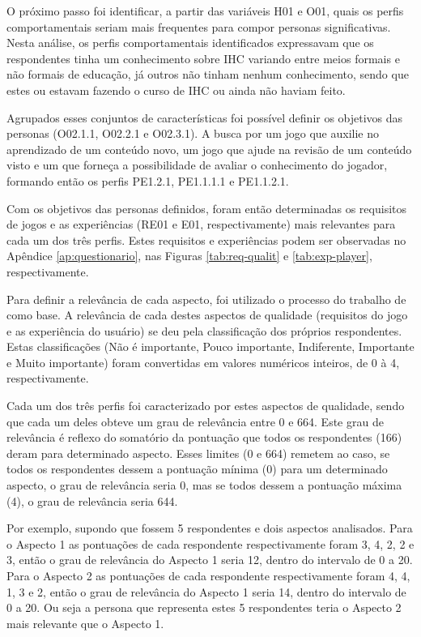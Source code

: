 O próximo passo foi identificar, a partir das variáveis H01 e O01, quais os perfis comportamentais seriam mais frequentes para compor personas significativas. Nesta análise, os perfis comportamentais identificados expressavam que os respondentes tinha um conhecimento sobre IHC variando entre meios formais e não formais de educação, já outros não tinham nenhum conhecimento, sendo que estes ou estavam fazendo o curso de IHC ou ainda não haviam feito.

Agrupados esses conjuntos de características foi possível definir os objetivos das personas (O02.1.1, O02.2.1 e O02.3.1). A busca por um jogo que auxilie no aprendizado de um conteúdo novo, um jogo que ajude na revisão de um conteúdo visto e um que forneça a possibilidade de avaliar o conhecimento do jogador, formando então os perfis PE1.2.1, PE1.1.1.1 e PE1.1.2.1. 

Com os objetivos das personas definidos, foram então determinadas os requisitos de jogos e as experiências (RE01 e E01, respectivamente) mais relevantes para cada um dos três perfis. Estes requisitos e experiências podem ser observadas no Apêndice \ref{ap:questionario}, nas Figuras \ref{tab:req-qualit} e \ref{tab:exp-player}, respectivamente.

Para definir a relevância de cada aspecto, foi utilizado o processo do trabalho de  como base. A relevância de cada destes aspectos de qualidade (requisitos do jogo e as experiência do usuário) se deu pela classificação dos próprios respondentes. Estas classificações (Não é importante, Pouco importante, Indiferente, Importante e Muito importante) foram convertidas em valores numéricos inteiros, de 0 à 4, respectivamente.

Cada um dos três perfis foi caracterizado por estes aspectos de qualidade, sendo que cada um deles obteve um grau de relevância entre 0 e 664. Este grau de relevância é reflexo do somatório da pontuação que todos os respondentes (166) deram para determinado aspecto. Esses limites (0 e 664) remetem ao caso, se todos os respondentes dessem a pontuação mínima (0) para um determinado aspecto, o grau de relevância seria 0, mas se todos dessem a pontuação máxima (4), o grau de relevância seria 644.

Por exemplo, supondo que fossem 5 respondentes e dois aspectos analisados. Para o Aspecto 1 as pontuações de cada respondente respectivamente foram 3, 4, 2, 2 e 3, então o grau de relevância do Aspecto 1 seria 12, dentro do intervalo de 0 a 20. Para o Aspecto 2 as pontuações de cada respondente respectivamente foram 4, 4, 1, 3 e 2, então o grau de relevância do Aspecto 1 seria 14, dentro do intervalo de 0 a 20. Ou seja a persona que representa estes 5 respondentes teria o Aspecto 2 mais relevante que o Aspecto 1. 

